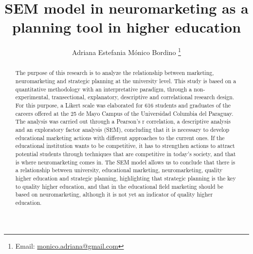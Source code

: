 \documentclass[english]{textolivre}
\title{SEM model in neuromarketing as a planning tool in higher education}
\author[1]{Adriana Estefania Mónico Bordino \orcid{0000-0003-2287-3833} \thanks{Email: \href{mailto:monico.adriana@gmail.com}{monico.adriana@gmail.com}}}
\affil[1]{Universidad Americana, Escuela de Posgrado, Asunción, Paraguay.}
\begin{document}
\maketitle

\begin{polyabstract}
\begin{abstract}
The purpose of this research is to analyze the relationship between marketing, neuromarketing and strategic planning at the university level. This study is based on a quantitative methodology with an interpretative paradigm, through a non-experimental, transectional, explanatory, descriptive and correlational research design.  For this purpose, a Likert scale was elaborated for 616 students and graduates of the careers offered at the 25 de Mayo Campus of the Universidad Columbia del Paraguay. The analysis was carried out through a Pearson's r correlation, a descriptive analysis and an exploratory factor analysis (SEM), concluding that it is necessary to develop educational marketing actions with different approaches to the current ones. If the educational institution wants to be competitive, it has to strengthen actions to attract potential students through techniques that are competitive in today's society, and that is where neuromarketing comes in. The SEM model allows us to conclude that there is a relationship between university, educational marketing, neuromarketing, quality higher education and strategic planning, highlighting that strategic planning is the key to quality higher education, and that in the educational field marketing should be based on neuromarketing, although it is not yet an indicator of quality higher education.

\end{abstract}


\end{polyabstract}
\end{document}

